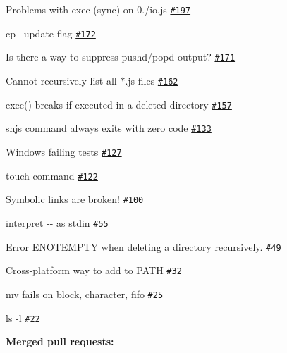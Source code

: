\begin{DoxyItemize}
\item Problems with exec (sync) on 0./io.js \href{https://github.com/shelljs/shelljs/issues/197}{\tt \#197}
\item cp --update flag \href{https://github.com/shelljs/shelljs/issues/172}{\tt \#172}
\item Is there a way to suppress pushd/popd output? \href{https://github.com/shelljs/shelljs/issues/171}{\tt \#171}
\item Cannot recursively list all $\ast$.js files \href{https://github.com/shelljs/shelljs/issues/162}{\tt \#162}
\item exec() breaks if executed in a deleted directory \href{https://github.com/shelljs/shelljs/issues/157}{\tt \#157}
\item shjs command always exits with zero code \href{https://github.com/shelljs/shelljs/issues/133}{\tt \#133}
\item Windows failing tests \href{https://github.com/shelljs/shelljs/issues/127}{\tt \#127}
\item touch command \href{https://github.com/shelljs/shelljs/issues/122}{\tt \#122}
\item Symbolic links are broken! \href{https://github.com/shelljs/shelljs/issues/100}{\tt \#100}
\item interpret {\ttfamily -\/-\/} as stdin \href{https://github.com/shelljs/shelljs/issues/55}{\tt \#55}
\item Error E\+N\+O\+T\+E\+M\+P\+TY when deleting a directory recursively. \href{https://github.com/shelljs/shelljs/issues/49}{\tt \#49}
\item Cross-\/platform way to add to P\+A\+TH \href{https://github.com/shelljs/shelljs/issues/32}{\tt \#32}
\item {\ttfamily mv} fails on block, character, fifo \href{https://github.com/shelljs/shelljs/issues/25}{\tt \#25}
\item ls -\/l \href{https://github.com/shelljs/shelljs/issues/22}{\tt \#22}
\end{DoxyItemize}

{\bfseries Merged pull requests\+:}


